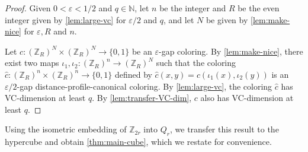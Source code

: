 \documentclass[11pt]{article}
\theoremstyle{remark}
\begin{document}
\begin{proof}
    Given $0 < \varepsilon < 1/2$ and $q \in \mathbb{N}$, let $n$ be the integer and $R$ be the even integer given by \cref{lem:large-vc} for $\varepsilon/2$ and $q$, and let $N$ be given by \cref{lem:make-nice} for $\varepsilon, R$ and $n$.
    
    Let $c : (\mathbb{Z}_R)^N \times (\mathbb{Z}_R)^N \to \{0, 1\}$ be an $\varepsilon$-gap coloring.
    By \cref{lem:make-nice}, there exist two maps $\iota_1, \iota_2 : (\mathbb{Z}_R)^n \to (\mathbb{Z}_R)^N$ such that the coloring $\widehat{c} : (\mathbb{Z}_{R})^n \times (\mathbb{Z}_{R})^n \to \{0, 1\}$ defined by $\widehat{c}(x, y) = c(\iota_1(x), \iota_2(y))$ is an $\varepsilon/2$-gap distance-profile-canonical coloring.
    By \cref{lem:large-vc}, the coloring $\widehat{c}$ has VC-dimension at least $q$.
    By \cref{lem:transfer-VC-dim}, $c$ also has VC-dimension at least $q$.
\end{proof}

Using the isometric embedding of $\mathbb Z_{2r}$ into $Q_r$, we transfer this result to the hypercube and obtain \cref{thm:main-cube}, which we restate for convenience.

\gaphamming*
\end{document}

